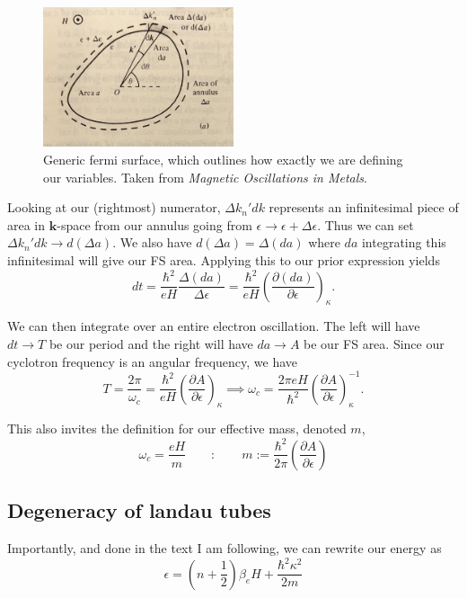 \documentclass[12pt]{revtex4-2}
\begin{document}
\begin{figure}[tb]
\centering
\includegraphics[width=0.5\textwidth]{figures/fermi_surface.jpg}
\caption{Generic fermi surface, which outlines how exactly we are defining our variables.  Taken from \textit{Magnetic Oscillations in Metals}.}
\label{fig:fermi-surface}
\end{figure}

Looking at our (rightmost) numerator, $\Delta k_n' dk$ represents an infinitesimal piece of area in $\mathbf{k}$-space from our annulus going from $\epsilon \to \epsilon + \Delta\epsilon$.  Thus we can set $\Delta k_n' dk \to d(\Delta a)$.  We also have $d(\Delta a) = \Delta(da)$ where $da$ integrating this infinitesimal will give our FS area.  Applying this to our prior expression yields
\begin{equation}
    dt = \frac{\hbar^2}{eH} \frac{\Delta (da)}{\Delta \epsilon} = \frac{\hbar^2}{eH}\left( \frac{\partial(da)}{\partial\epsilon} \right)_\kappa.
\end{equation}

We can then integrate over an entire electron oscillation.  The left will have $dt \to T$ be our period and the right will have $da \to A$ be our FS area.  Since our cyclotron frequency is an angular frequency, we have 
\begin{equation}
    T = \frac{2\pi}{\omega_c} = \frac{\hbar^2}{eH}\left( \frac{\partial A}{\partial\epsilon} \right)_\kappa \implies \omega_c = \frac{2\pi eH}{ \hbar^2}\left( \frac{\partial A}{\partial\epsilon} \right)_\kappa^{-1}.
\end{equation}

This also invites the definition for our effective mass, denoted $m$,
\begin{equation}
    \boxed{\omega_c = \frac{eH}{m} \qquad : \qquad m := \frac{\hbar^2}{2\pi}\left(\frac{\partial A}{\partial \epsilon}\right) }
\end{equation}

\subsection{Degeneracy of landau tubes}
Importantly, and done in the text I am following, we can rewrite our energy as 
\begin{equation}
    \epsilon = \left( n + \frac{1}{2} \right)\beta_e H + \frac{\hbar^2\kappa^2}{2m}
\end{equation}
\end{document}
